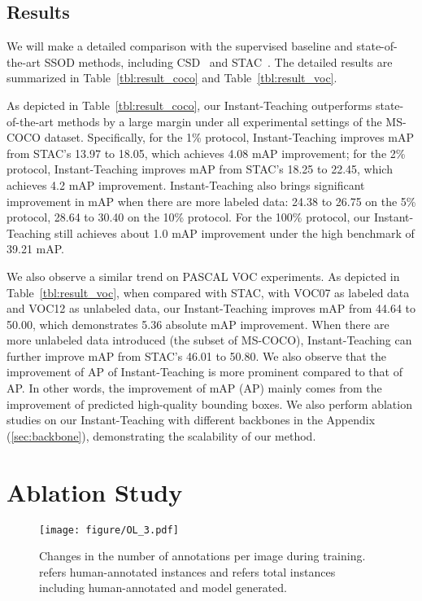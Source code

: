 \documentclass[final]{cvpr}
\begin{document}
\subsection{Results}

We will make a detailed comparison with the supervised baseline and state-of-the-art SSOD methods, including CSD~\cite{jeong2019consistency} and STAC~\cite{sohn2020simple}. The detailed results are summarized in Table~\ref{tbl:result_coco} and Table~\ref{tbl:result_voc}.

As depicted in Table~\ref{tbl:result_coco}, our Instant-Teaching outperforms state-of-the-art methods by a large margin under all experimental settings of the MS-COCO dataset. Specifically, for the 1\% protocol, Instant-Teaching improves mAP from STAC's 13.97 to 18.05, which achieves 4.08 mAP improvement; for the 2\% protocol, Instant-Teaching improves mAP from STAC's 18.25 to 22.45, which achieves 4.2 mAP improvement. Instant-Teaching also brings significant improvement in mAP when there are more labeled data: 24.38 to 26.75 on the 5\% protocol, 28.64 to 30.40 on the 10\% protocol. For the 100\% protocol, our Instant-Teaching still achieves about 1.0 mAP improvement under the high benchmark of 39.21 mAP.

We also observe a similar trend on PASCAL VOC experiments. 
As depicted in Table~\ref{tbl:result_voc},
when compared with STAC, with VOC07 as labeled data and VOC12 as unlabeled data, our Instant-Teaching improves mAP from 44.64 to 50.00, which demonstrates 5.36 absolute mAP improvement. When there are more unlabeled data introduced (the subset of MS-COCO), Instant-Teaching can further improve mAP from STAC's 46.01 to 50.80.
We also observe that the improvement of AP of Instant-Teaching is more prominent compared to that of AP. In other words, the improvement of mAP (AP) mainly comes from the improvement of predicted high-quality bounding boxes.
We also perform ablation studies on our Instant-Teaching with different backbones in the Appendix (\ref{sec:backbone}), demonstrating the scalability of our method.




\section{Ablation Study}
 
\begin{figure}[t!]
	\begin{center}
	\texttt{[image: figure/OL\_3.pdf]}
	\end{center}
	\vspace{-.1in}
	\caption{Changes in the number of annotations per image during training.  refers human-annotated instances and  refers total instances including human-annotated and model generated.}
	\label{fig:online_pseudo}
	\vspace{-.25in}
\end{figure}
\end{document}
